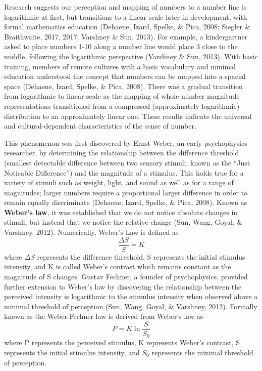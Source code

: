 \documentclass[print]{nuthesis}
\begin{document}
Research suggests our perception and mapping of numbers to a number line is logarithmic at first, but transitions
to a linear scale later in development, with formal mathematics education (Dehaene, Izard, Spelke, \& Pica, 2008; Siegler \& Braithwaite, 2017, 2017; Varshney \& Sun, 2013).
For example, a kindergartner asked to place numbers 1-10 along a number line would place 3 close to the middle, following the logarithmic perspective (Varshney \& Sun, 2013). 
With basic training, members of remote cultures with a basic vocabulary and minimal education understood the concept that numbers can be mapped into a spacial space (Dehaene, Izard, Spelke, \& Pica, 2008). 
There was a gradual transition from logarithmic to linear scale as the mapping of whole number magnitude representations transitioned from a compressed (approximately logarithmic) distribution to an approximately linear one.
These results indicate the universal and cultural-dependent characteristics of the sense of number.


This phenomenon was first discovered by Ernst Weber, an early psychophysics researcher, by determining the relationship between the difference threshold (smallest detectable difference between two sensory stimuli; known as the ``Just Noticable Difference'') and the magnitude of a stimulus.
This holds true for a variety of stimuli such as weight, light, and sound as well as for a range of magnitudes; larger numbers require a proportional larger difference in order to remain equally discriminate (Dehaene, Izard, Spelke, \& Pica, 2008).
Known as \textbf{Weber's law}, it was established that we do not notice absolute changes in stimuli, but instead that we notice the relative change (Sun, Wang, Goyal, \& Varshney, 2012).
Numerically, Weber's Law is defined as
\begin{equation}
\frac{\Delta S}{S} = K
\end{equation}
where \(\Delta S\) represents the difference threshold, S represents the initial stimulus intensity, and K is called Weber's contrast which remains constant as the magnitude of S changes.
Gustav Fechner, a founder of psychophysics, provided further extension to Weber's law by discovering the relationship between the perceived intensity is logarithmic to the stimulus intensity when observed above a minimal threshold of perception (Sun, Wang, Goyal, \& Varshney, 2012).
Formally known as the Weber-Fechner law is derived from Weber's law as
\begin{equation}
P = K\ln \frac{S}{S_0}
\end{equation}
where P represents the perceived stimulus, K represents Weber's contrast, S represents the initial stimulus intensity, and \(S_0\) represents the minimal threshold of perception.
\end{document}
